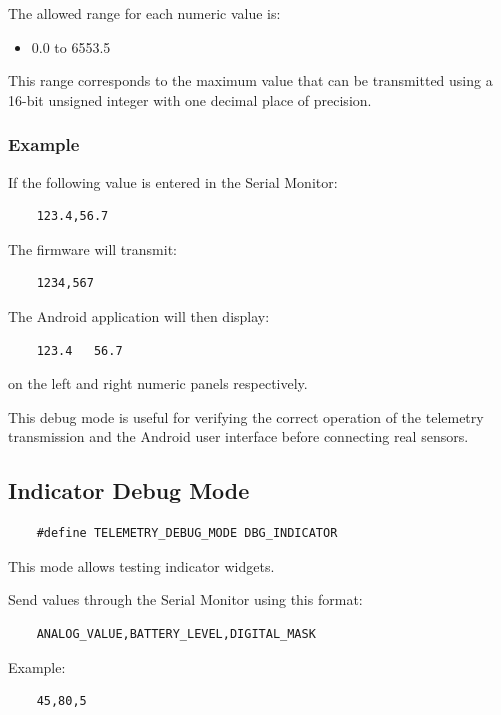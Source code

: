 The allowed range for each numeric value is:

\begin{itemize}
	\item 0.0 to 6553.5
\end{itemize}

This range corresponds to the maximum value that can be transmitted
using a 16-bit unsigned integer with one decimal place of precision.

\subsubsection{Example}

If the following value is entered in the Serial Monitor:

\begin{verbatim}
	123.4,56.7
\end{verbatim}

The firmware will transmit:

\begin{verbatim}
	1234,567
\end{verbatim}

The Android application will then display:

\begin{verbatim}
	123.4   56.7
\end{verbatim}

on the left and right numeric panels respectively.

This debug mode is useful for verifying the correct operation of the
telemetry transmission and the Android user interface before connecting
real sensors.


\subsection{Indicator Debug Mode}

\begin{verbatim}
	#define TELEMETRY_DEBUG_MODE DBG_INDICATOR
\end{verbatim}

This mode allows testing indicator widgets.

Send values through the Serial Monitor using this format:

\begin{verbatim}
	ANALOG_VALUE,BATTERY_LEVEL,DIGITAL_MASK
\end{verbatim}

Example:

\begin{verbatim}
	45,80,5
\end{verbatim}

